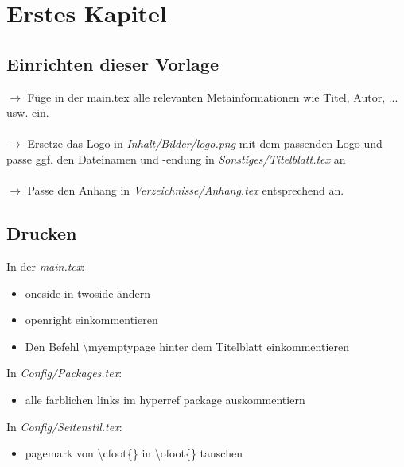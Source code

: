 \chapter{Erstes Kapitel}
\label{chap:Erstes Kapitel}
%
%
\section{Einrichten dieser Vorlage}
\label{sec:Einrichten dieser Vorlage}
%
$\rightarrow$ Füge in der main.tex alle relevanten Metainformationen wie Titel, Autor, ... usw. ein.\\\\
%
$\rightarrow$ Ersetze das Logo in \textit{Inhalt/Bilder/logo.png} mit dem passenden Logo und passe ggf. den Dateinamen und -endung in \textit{Sonstiges/Titelblatt.tex} an\\\\
%
$\rightarrow$ Passe den Anhang in \textit{Verzeichnisse/Anhang.tex} entsprechend an.
%
%
\section{Drucken}
\label{sec:Drucken}
%
In der \textit{main.tex}:
\begin{itemize}
    \item oneside in twoside ändern
    \item openright einkommentieren
    \item  Den Befehl \textbackslash myemptypage hinter dem Titelblatt einkommentieren
\end{itemize}
%
In \textit{Config/Packages.tex}: 
\begin{itemize}
    \item alle farblichen links im hyperref package auskommentiern
\end{itemize}
%
In \textit{Config/Seitenstil.tex}: 
\begin{itemize}
    \item  pagemark von \textbackslash cfoot\{\} in \textbackslash ofoot\{\} tauschen
\end{itemize}
%
%
